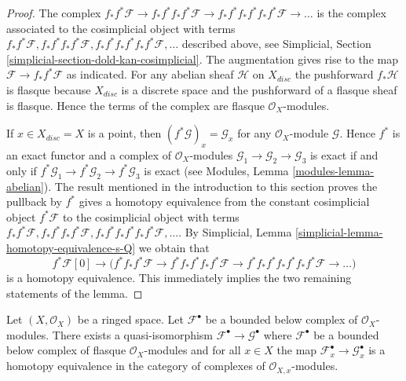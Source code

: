 \begin{proof}
The complex $f_*f^*\mathcal{F} \to  f_*f^*f_*f^*\mathcal{F} \to
f_*f^*f_*f^*f_*f^*\mathcal{F} \to \ldots$ is the complex associated
to the cosimplicial object with terms
$f_*f^*\mathcal{F}, f_*f^*f_*f^*\mathcal{F},
f_*f^*f_*f^*f_*f^*\mathcal{F}, \ldots$ described above, see
Simplicial, Section \ref{simplicial-section-dold-kan-cosimplicial}.
The augmentation gives rise to the map $\mathcal{F} \to f_*f^*\mathcal{F}$
as indicated. For any abelian sheaf $\mathcal{H}$ on $X_{disc}$ the
pushforward $f_*\mathcal{H}$ is flasque because $X_{disc}$
is a discrete space and the pushforward of a flasque sheaf is flasque.
Hence the terms of the complex are flasque $\mathcal{O}_X$-modules.

\medskip\noindent
If $x \in X_{disc} = X$ is a point, then $(f^*\mathcal{G})_x = \mathcal{G}_x$
for any $\mathcal{O}_X$-module $\mathcal{G}$. Hence $f^*$ is an exact functor
and a complex of $\mathcal{O}_X$-modules
$\mathcal{G}_1 \to \mathcal{G}_2 \to \mathcal{G}_3$
is exact if and only if
$f^*\mathcal{G}_1 \to f^*\mathcal{G}_2 \to f^*\mathcal{G}_3$
is exact (see Modules, Lemma \ref{modules-lemma-abelian}).
The result mentioned in the introduction to this section
proves the pullback by $f^*$ gives a homotopy equivalence from
the constant cosimplicial object $f^*\mathcal{F}$ to the
cosimplicial object with terms
$f_*f^*\mathcal{F}, f_*f^*f_*f^*\mathcal{F},
f_*f^*f_*f^*f_*f^*\mathcal{F}, \ldots$.
By Simplicial, Lemma \ref{simplicial-lemma-homotopy-equivalence-s-Q}
we obtain that
$$
f^*\mathcal{F}[0] \to \Big(
f^*f_*f^*\mathcal{F} \to
f^*f_*f^*f_*f^*\mathcal{F} \to
f^*f_*f^*f_*f^*f_*f^*\mathcal{F} \to \ldots
\Big)
$$
is a homotopy equivalence. This immediately implies the two remaining
statements of the lemma.
\end{proof}

\begin{lemma}
\label{lemma-godement-resolution-bounded-below}
Let $(X, \mathcal{O}_X)$ be a ringed space. Let
$\mathcal{F}^\bullet$ be a bounded below complex of
$\mathcal{O}_X$-modules. There exists a quasi-isomorphism
$\mathcal{F}^\bullet \to \mathcal{G}^\bullet$
where $\mathcal{F}^\bullet$ be a bounded below complex of flasque
$\mathcal{O}_X$-modules and for all $x \in X$ the
map $\mathcal{F}^\bullet_x \to \mathcal{G}^\bullet_x$
is a homotopy equivalence in the category of complexes
of $\mathcal{O}_{X, x}$-modules.
\end{lemma}

